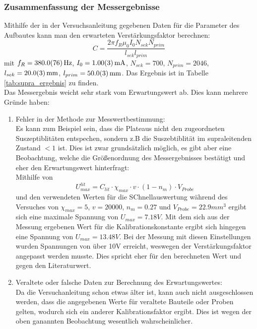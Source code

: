 \documentclass[12pt,a4paper]{article}
\begin{document}
\newpage
\subsubsection{Zusammenfassung der Messergebnisse}
Mithilfe der in der Versuchsanleitung gegebenen Daten für die Parameter des Aufbautes kann man den erwarteten Verstärkungsfaktor berechnen:
\begin{equation}
C = \dfrac{2\pi f_R \mu_0 I_0 N_{sek} N_{prim}}{l_{sek} l_{prim}}
\end{equation}
mit $f_R = \SI{380\pm 7.6}{Hz}$, $I_0 = \SI{1 \pm 0.03}{mA}$, $N_{sek} = 700$, $N_{prim} = 2046$, $l_{sek} = \SI{20\pm 0.3}{mm}$, $l_{prim} = \SI{50 \pm 0.3}{mm}$. Das Ergebnis ist in Tabelle \ref{tab:supra_ergebnis} zu finden.\\
Das Messergebnis weicht sehr stark vom Erwartungswert ab. Dies kann mehrere Gründe haben:
\begin{enumerate}
\item Fehler in der Methode zur Messwertbestimmung:\\
Es kann zum Beispiel sein, dass die Plateaus nicht den zugeordneten Suszeptiblitäten entspechen, sondern z.B die Suszebtiblität im supraleitenden Zustand $<1$ ist.
Dies ist zwar grundsätzlich möglich, es gibt aber eine Beobachtung, welche die Größenordnung des Messergebnisses bestätigt und eher den Erwartungswert hinterfragt:\\
Mithilfe von 
\begin{equation}
U_{max}^{lit} = C_{lit} \cdot \chi_{max} \cdot v \cdot (1-n_m) \cdot V_{Probe}
\end{equation}
und den verwendeten Werten für die SChnellauswertung während des Versuches von $\chi_{max} = 5$, $v = 20000$, $n_m = 0.27$ und $V_{Probe} = 22.9mm^3$ ergibt sich eine maximale Spannung von $U_{max} = 7.18V$. Mit dem sich aus der Messung ergebenen Wert für die Kalibrationskonstante ergibt sich hingegen eine Spannung von $U_{max} = 13.48V$. Bei der Messung mit diesen Einstellungen wurden Spannungen von über 10V erreicht, weswegen der Verstärkungsfaktor angepasst werden musste. Dies spricht eher für den berechneten Wert und gegen den Literaturwert.
\item Veraltete oder falsche Daten zur Berechnung des Erwartungswertes:\\
Da die Versuchanleitung schon etwas älter ist, kann auch nicht ausgeschlossen werden, dass die angegebenen Werte für veraltete Bauteile oder Proben gelten, wodurch sich ein anderer Kalibrationsfaktor ergibt. Dies ist wegen der oben ganannten Beobachtung wesentlich wahrscheinlicher.
\end{enumerate}
\end{document}
